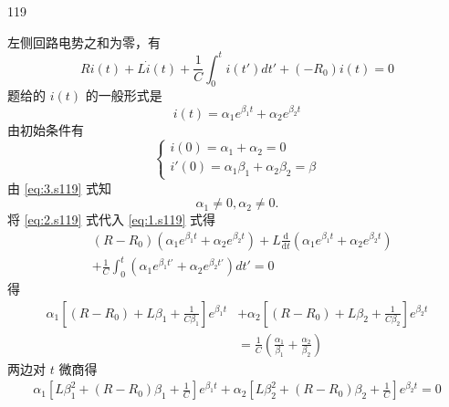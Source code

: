 \begin{solution}{119}
    \begin{subsolution}
        左侧回路电势之和为零，有
        \begin{equation}
            R i(t) + L \dot{i}(t) + \frac{1}{C} \int_{0}^{t} i(t') dt' + (-R_{0}) i(t) = 0
            \label{eq:1.s119}
        \end{equation}
        题给的 $i(t)$ 的一般形式是
        \begin{equation}
            i(t) = \alpha_{1} e^{\beta_{1} t} + \alpha_{2} e^{\beta_{2} t}
            \label{eq:2.s119}
        \end{equation}
        由初始条件有
        \begin{equation}
            \left\{ \begin{array}{l} i(0) = \alpha_{1} + \alpha_{2} = 0 \\ i'(0) = \alpha_{1} \beta_{1} + \alpha_{2} \beta_{2} = \beta \end{array} \right.
            \label{eq:3.s119}
        \end{equation}
        由 \eqref{eq:3.s119} 式知
        \begin{equation}
            \alpha_{1} \neq 0, \alpha_{2} \neq 0.
            \label{eq:4.s119}
        \end{equation}
        将 \eqref{eq:2.s119} 式代入 \eqref{eq:1.s119} 式得
        \begin{align}
            & (R - R_{0}) (\alpha_{1} e^{\beta_{1} t} + \alpha_{2} e^{\beta_{2} t}) + L \frac{\mathrm{d}}{\mathrm{d} t} (\alpha_{1} e^{\beta_{1} t} + \alpha_{2} e^{\beta_{2} t}) \nonumber \\
            & + \frac{1}{C} \int_{0}^{t} (\alpha_{1} e^{\beta_{1} t'} + \alpha_{2} e^{\beta_{2} t'}) dt' = 0
        \end{align}
        得
        \begin{align}
            \alpha_{1} \left[ (R - R_{0}) + L \beta_{1} + \frac{1}{C \beta_{1}} \right] e^{\beta_{1} t} & + \alpha_{2} \left[ (R - R_{0}) + L \beta_{2} + \frac{1}{C \beta_{2}} \right] e^{\beta_{2} t} \nonumber \\
            & = \frac{1}{C} \left(\frac{\alpha_{1}}{\beta_{1}} + \frac{\alpha_{2}}{\beta_{2}}\right)
        \end{align}
        两边对 $t$ 微商得
        \begin{align}
            \alpha_{1} \left[ L \beta_{1}^{2} + (R - R_{0}) \beta_{1} + \frac{1}{C} \right] e^{\beta_{1} t} + \alpha_{2} \left[ L \beta_{2}^{2} + (R - R_{0}) \beta_{2} + \frac{1}{C} \right] e^{\beta_{2} t} = 0

\end{align}
\end{subsolution}
\end{solution}
